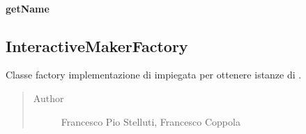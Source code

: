 \documentclass[letterpaper,10pt,italian,openany,oneside]{sphinxmanual}
\begin{document}
\paragraph{getName}
\label{\detokenize{test/it/unicam/cs/pa/mastermind/factories/InteractiveBreakerFactory:getname}}

\begin{fulllineitems}
\label{\detokenize{test/it/unicam/cs/pa/mastermind/factories/InteractiveBreakerFactory:it.unicam.cs.pa.mastermind.factories.InteractiveBreakerFactory.getName()}}
\end{fulllineitems}



\subsection{InteractiveMakerFactory}
\label{\detokenize{test/it/unicam/cs/pa/mastermind/factories/InteractiveMakerFactory:interactivemakerfactory}}\label{\detokenize{test/it/unicam/cs/pa/mastermind/factories/InteractiveMakerFactory::doc}}

\begin{fulllineitems}
\label{\detokenize{test/it/unicam/cs/pa/mastermind/factories/InteractiveMakerFactory:it.unicam.cs.pa.mastermind.factories.InteractiveMakerFactory}}
Classe factory implementazione di  impiegata per ottenere istanze di .
\begin{quote}\begin{description}
\item[{Author}] \leavevmode
Francesco Pio Stelluti, Francesco Coppola

\end{description}\end{quote}

\end{fulllineitems}
\end{document}
